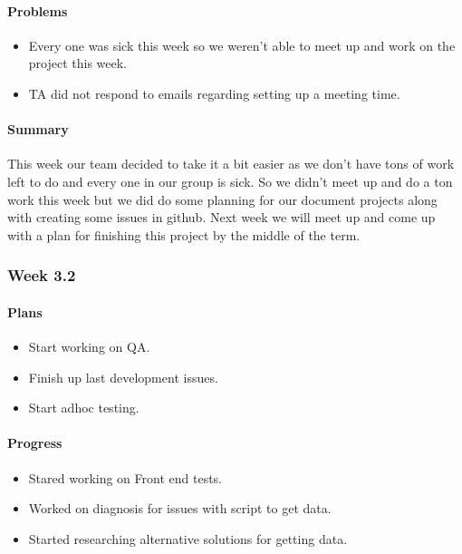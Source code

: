 \documentclass[onecolumn, draftclsnofoot,10pt, compsoc]{article}
\begin{document}
		    \paragraph{Problems} \hfill \break
		        \begin{itemize}
		            \item Every one was sick this week so we weren't able to meet up and work on the project this week.\\
		            \item TA did not respond to emails regarding setting up a meeting time.\\
		        \end{itemize}
		    \paragraph{Summary} \hfill \break
		    This week our team decided to take it a bit easier as we don't have tons of work left to do and every one in our group is sick. So we didn't meet up and do a ton work this week but we did do some planning for our document projects along with creating some issues in github. Next week we will meet up and come up with a plan for finishing this project by the middle of the term.\\

        \subsubsection{Week 3.2}
		    \paragraph{Plans} \hfill \break
		        \begin{itemize}
		            \item Start working on QA.\\
		            \item Finish up last development issues.\\
		            \item Start adhoc testing.\\
		        \end{itemize}
		    \paragraph{Progress} \hfill \break
		        \begin{itemize}
		            \item Stared working on Front end tests.\\
		            \item Worked on diagnosis for issues with script to get data.\\
		            \item Started researching alternative solutions for getting data.\\
		        \end{itemize}
\end{document}
